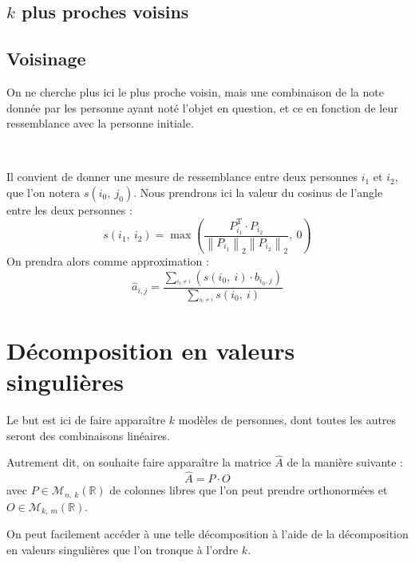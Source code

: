 \documentclass[10pt, a4paper]{article}
\newcommand{\Ap}{\widehat{A}} %
\newcommand{\Bc}[2]{b_{#1,#2}} %
\newcommand{\Apc}[2]{\widehat{a}_{#1,#2}} %
\newcommand{\norme}[2]{\left\lVert #1 \right\rVert_{#2}} %
\newcommand{\tr}[1]{#1^{\mathrm{T}}} %
\newcommand{\pp}[1]{\left(#1\right)} %
\newcommand{\nl}{

~

} %
\begin{document}
\subsection{$k$ plus proches voisins}

\subsection{Voisinage}

On ne cherche plus ici le plus proche voisin, mais une combinaison de la note donnée par les personne ayant noté l'objet en question, et ce en fonction de leur ressemblance avec la personne initiale.
\nl
Il convient de donner une mesure de ressemblance entre deux personnes $i_1$ et $i_2$, que l'on notera $s\pp{i_0,\:j_0}$.
Nous prendrons ici la valeur du cosinus de l'angle entre les deux personnes : \[
	s\pp{i_1,\:i_2} = \max\pp{\frac{\tr{P_{i_1}}\!\cdot\!P_{i_2}}{\norme{P_{i_1}}{2}\norme{P_{i_2}}{2}},\:0}
\]
On prendra alors comme approximation : \[
	\Apc{i}{j} = \frac{\underset{^{i_0\neq i}}{\sum}\pp{ s\pp{i_0,\:i}\!\cdot\!\Bc{i_0}{j}}}%
				{\underset{^{i_0\neq i}}{\sum}s\pp{i_0,\:i}}
\]


\section{Décomposition en valeurs singulières}

Le but est ici de faire apparaître $k$ modèles de personnes, dont toutes les autres seront des combinaisons linéaires.

Autrement dit, on souhaite faire apparaître la matrice $\Ap$ de la manière suivante : \[
	\Ap = P\cdot O
\]
avec $P \in \mathcal{M}_{n,\:k}\pp{\mathbb{R}}$ de colonnes libres que l'on peut prendre orthonormées et $O \in \mathcal{M}_{k,\:m}\pp{\mathbb{R}}$.

On peut facilement accéder à une telle décomposition à l'aide de la décomposition en valeurs singulières que l'on tronque à l'ordre $k$.
\end{document}

